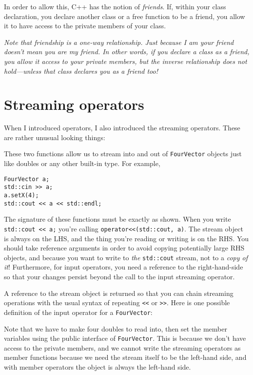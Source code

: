 \documentclass[a4paper]{scrartcl}
\begin{document}
In order to allow this, C++ has the notion of \emph{friends}. If, within your class declaration, you declare another class or a free function to be a friend, you allow it to have access to the private members of your class.

\emph{Note that friendship is a one-way relationship. Just because I am your friend doesn't mean you are my friend. In other words, if you declare a class as a friend, you allow it access to your private members, but the inverse relationship does not hold---unless that class declares you as a friend too!}

\section{Streaming operators}\label{sec:streaming-operators}
When I introduced operators, I also introduced the streaming operators. These are rather unusual looking things:



These two functions allow us to stream into and out of \verb|FourVector| objects just like doubles or any other built-in type. For example,

\begin{verbatim}
FourVector a;
std::cin >> a;
a.setX(4);
std::cout << a << std::endl;
\end{verbatim}

The signature of these functions must be exactly as shown. When you write \newline \verb|std::cout << a;| you're calling \verb|operator<<(std::cout, a)|. The stream object is always on the LHS, and the thing you're reading or writing is on the RHS. You should take reference arguments in order to avoid copying potentially large RHS objects, and because you want to write to \emph{the} \verb|std::cout| stream, not to a \emph{copy of it}! Furthermore, for input operators, you need a reference to the right-hand-side so that your changes persist beyond the call to the input streaming operator.

A reference to the stream object is returned so that you can chain streaming operations with the usual syntax of repeating \verb|<<| or \verb|>>|. Here is one possible definition of the input operator for a \verb|FourVector|:



Note that we have to make four doubles to read into, then set the member variables using the public interface of \verb|FourVector|. This is because we don't have access to the private members, and we cannot write the streaming operators as member functions because we need the stream itself to be the left-hand side, and with member operators the object is always the left-hand side.
\end{document}
